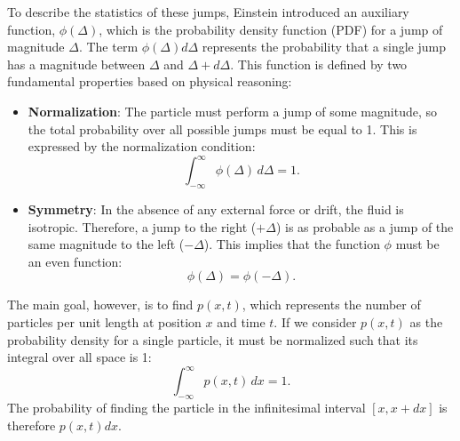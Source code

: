 \begin{center}
\end{center}

To describe the statistics of these jumps, Einstein introduced an auxiliary function, $\phi(\Delta)$, which is the probability density function (PDF) for a jump of magnitude $\Delta$. The term $\phi(\Delta)d\Delta$ represents the probability that a single jump has a magnitude between $\Delta$ and $\Delta+d\Delta$. This function is defined by two fundamental properties based on physical reasoning:
\begin{itemize}
    \item \textbf{Normalization}: The particle must perform a jump of some magnitude, so the total probability over all possible jumps must be equal to 1. This is expressed by the normalization condition:
    \begin{equation}
    \int_{-\infty}^{\infty} \phi(\Delta) \,d\Delta = 1.
    \end{equation}
    \item \textbf{Symmetry}: In the absence of any external force or drift, the fluid is isotropic. Therefore, a jump to the right ($+\Delta$) is as probable as a jump of the same magnitude to the left ($-\Delta$). This implies that the function $\phi$ must be an even function:
    \begin{equation}
    \phi(\Delta) = \phi(-\Delta).
    \end{equation}
\end{itemize}

The main goal, however, is to find $p(x,t)$, which represents the number of particles per unit length at position $x$ and time $t$. If we consider $p(x,t)$ as the probability density for a single particle, it must be normalized such that its integral over all space is 1:
\begin{equation}
\int_{-\infty}^{\infty} p(x,t) \,dx = 1.
\end{equation}
The probability of finding the particle in the infinitesimal interval $[x, x+dx]$ is therefore $p(x,t)dx$.

